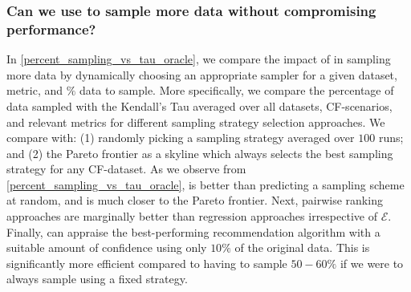 % 

\subsubsection{Can we use \oracle to sample more data without compromising performance? \ \ } In \cref{percent_sampling_vs_tau_oracle}, we compare the impact of \oracle in sampling more data by dynamically choosing an appropriate sampler for a given dataset, metric, and $\%$ data to sample. 
More specifically,
we compare the percentage of data sampled with the Kendall's Tau averaged over all datasets, CF-scenarios, and relevant metrics for different sampling strategy selection approaches. We compare \oracle with: (1) randomly picking a sampling strategy averaged over $100$ runs; and (2) the Pareto frontier as a skyline which always selects the best sampling strategy for any CF-dataset. As we observe from \cref{percent_sampling_vs_tau_oracle}, \oracle is better than predicting a sampling scheme at random, and 
is
much closer to the Pareto frontier. Next, pairwise ranking approaches are marginally better than regression approaches 
irrespective of $\mathcal{E}$. Finally, \oracle can appraise the best-performing recommendation algorithm with a suitable amount of confidence using only $10\%$ of the original data. This is significantly more efficient compared to having to sample $50-60\%$ if we were to always sample using a fixed strategy.
\newcommand{\STAB}[1]{\begin{tabular}{@{}c@{}}#1\end{tabular}}
